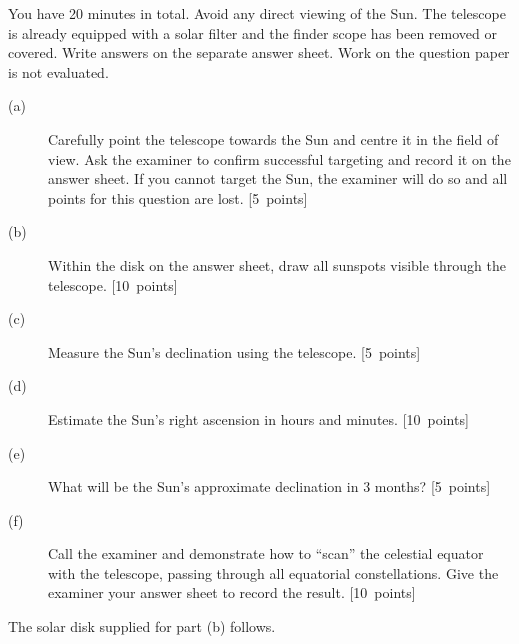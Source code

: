 You have 20 minutes in total. Avoid any direct viewing of the Sun. The telescope is already equipped
with a solar filter and the finder scope has been removed or covered. Write answers on the separate
answer sheet. Work on the question paper is not evaluated.
\begin{description}
\item[(a)] Carefully point the telescope towards the Sun and centre it in the field of view.
Ask the examiner to confirm successful targeting and record it on the answer sheet. If you cannot target
the Sun, the examiner will do so and all points for this question are lost. \hfill\mbox{[5 points]}
\item[(b)] Within the disk on the answer sheet, draw all sunspots visible through the telescope. \hfill\mbox{[10 points]}
\item[(c)] Measure the Sun's declination using the telescope. \hfill\mbox{[5 points]}
\item[(d)] Estimate the Sun's right ascension in hours and minutes. \hfill\mbox{[10 points]}
\item[(e)] What will be the Sun's approximate declination in 3 months? \hfill\mbox{[5 points]}
\item[(f)] Call the examiner and demonstrate how to ``scan'' the celestial equator with the telescope,
passing through all equatorial constellations. Give the examiner your answer sheet to record the result. \hfill\mbox{[10 points]}
\end{description}
The solar disk supplied for part (b) follows.
